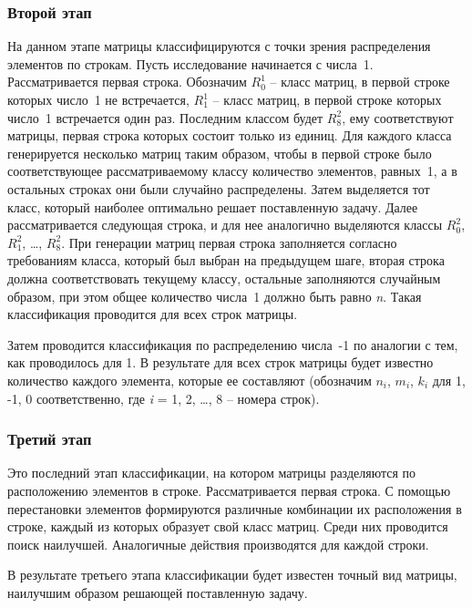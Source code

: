 \documentclass[11pt, oneside, a4paper]{article}
\begin{document}
\subsubsection{Второй этап}

На данном этапе матрицы классифицируются с точки зрения распределения элементов по строкам. Пусть исследование начинается с числа~1. Рассматривается первая строка. Обозначим $R^1_0$ – класс матриц, в первой строке которых число~1 не встречается, $R^1_1$ – класс матриц, в первой строке которых число~1 встречается один раз. Последним классом будет $R^2_8$, ему соответствуют матрицы, первая строка которых состоит только из единиц. Для каждого класса генерируется несколько матриц таким образом, чтобы в первой строке было соответствующее рассматриваемому классу количество элементов, равных~1, а в остальных строках они были случайно распределены. Затем выделяется тот класс, который наиболее оптимально решает поставленную задачу. Далее рассматривается следующая строка, и для нее аналогично выделяются классы $R^2_0$, $R^2_1$, \ldots, $R^2_8$. При генерации матриц первая строка заполняется согласно требованиям класса, который был выбран на предыдущем шаге, вторая строка должна соответствовать текущему классу, остальные заполняются случайным образом, при этом общее количество числа~1 должно быть равно {\it n}. Такая классификация проводится для всех строк матрицы. 

Затем проводится классификация по распределению числа~-1 по аналогии с тем, как проводилось для 1. В результате для всех строк матрицы будет известно количество каждого элемента, которые ее составляют (обозначим $n_i$, $m_i$, $k_i$ для 1, -1, 0 соответственно, где {\it i} = 1, 2, \ldots, 8 -- номера строк).

\subsubsection{Третий этап}

Это последний этап классификации, на котором матрицы разделяются по расположению элементов в строке. Рассматривается первая строка. С помощью перестановки элементов формируются различные комбинации их расположения в строке, каждый из которых образует свой класс матриц. Среди них проводится поиск наилучшей. Аналогичные действия производятся для каждой строки.

В результате третьего этапа классификации будет известен точный вид матрицы, наилучшим образом решающей поставленную задачу.
\end{document}
